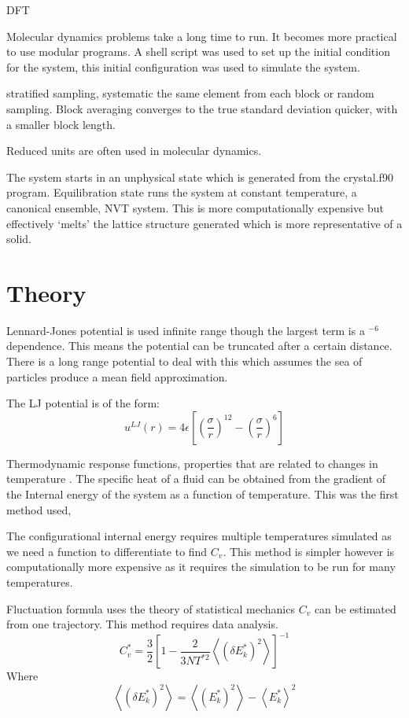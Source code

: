 \documentclass[a4paper, oneside 12pt]{article}
\begin{document}
\begin{addmargin}[-3em]{-3em}
DFT 

Molecular dynamics problems take a long time to run. It becomes more practical to use modular programs. A shell script was used to set up the initial condition for the system, this initial configuration was used to simulate the system. 

stratified sampling, systematic the same element from each block or random sampling. Block averaging converges to the true standard deviation quicker, with a smaller block length.

Reduced units are often used in molecular dynamics. 

The system starts in an unphysical state which is generated from the crystal.f90 program. Equilibration state runs the system at constant temperature, a canonical ensemble, NVT system. This is more computationally expensive but effectively ‘melts’ the lattice structure generated which is more representative of a solid.   


\newpage
\section{Theory}

Lennard-Jones potential is used infinite range though the largest term is a $^{-6}$ dependence. This means the potential can be truncated after a certain distance. There is a long range potential to deal with this which assumes the sea of particles produce a mean field approximation. 

The LJ potential is of the form:
\begin{equation}
	u^{LJ}(r)  = 4 \epsilon \left[ \left( \frac{\sigma}{r} \right)^{12} -  \left( \frac{\sigma}{r} \right)^6\right]
\end{equation}


Thermodynamic response functions, properties that are related to changes in temperature . The specific heat of a fluid can be obtained from the gradient of the Internal energy of the system as a function of temperature. This was the first method used,

The configurational internal energy requires multiple temperatures simulated as we need a function to differentiate to find $C_v$. This method is simpler however is computationally more expensive as it requires the simulation to be run for many temperatures.

Fluctuation formula uses the theory of statistical mechanics $C_v$ can be estimated from one trajectory. This method requires data analysis. 
\begin{equation}
	C_v^* = \frac{3}{2} \left[ 1 - \frac{2}{3 N T^{*2}} \left< ( \delta E^*_k)^2 \right> \right] ^{-1}
\end{equation}
Where 
\begin{equation}
	\left< ( \delta E^*_k)^2 \right> = \left< ( E^*_k)^2 \right> - \left< E^*_k \right>^2
\end{equation}


\end{addmargin}
\end{document}
